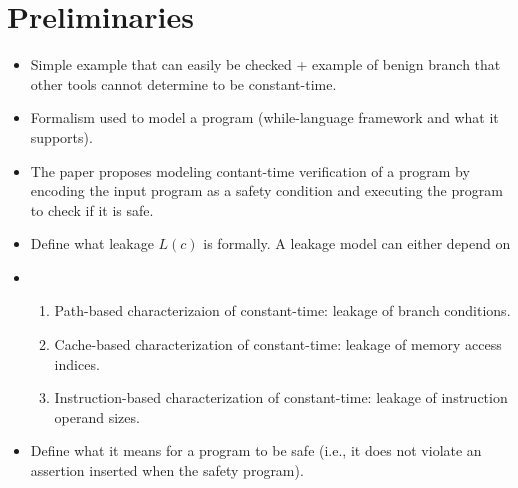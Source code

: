 \section{Preliminaries}


\begin{itemize}
  \item Simple example that can easily be checked + example of benign branch that other tools cannot determine to be constant-time.
  \item Formalism used to model a program (while-language framework and what it supports).
  \item The paper proposes modeling contant-time verification of a program by encoding the input program as a safety condition and executing the program to check if it is safe.
  \item Define what leakage $L(c)$ is formally. A leakage model can either depend on
        \item \begin{enumerate}
          \item Path-based characterizaion of constant-time: leakage of branch conditions.
          \item Cache-based characterization of constant-time: leakage of memory access indices.
          \item Instruction-based characterization of constant-time: leakage of instruction operand sizes.
        \end{enumerate}
  \item Define what it means for a program to be safe (i.e., it does not violate an assertion inserted when the safety program).
\end{itemize}
